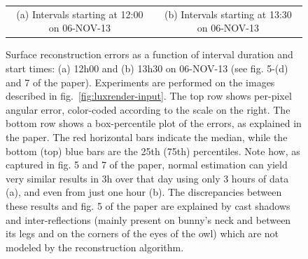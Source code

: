 \begin{figure}
\begin{tabular}{cc}
(a) Intervals starting at 12:00 on 06-NOV-13 & (b) Intervals starting at 13:30 on 06-NOV-13
\end{tabular}
\vspace{.5em}
\caption{\small Surface reconstruction errors as a function of interval duration and start times: (a) 12h00 and (b) 13h30 on 06-NOV-13 (see fig. 5-(d) and 7 of the paper). Experiments are performed on the images described in fig.~\ref{fig:luxrender-input}. The top row shows per-pixel angular error, color-coded according to the scale on the right. The bottom row shows a box-percentile plot of the errors, as explained in the paper. The red horizontal bars indicate the median, while the bottom (top) blue bars are the 25th (75th) percentiles. Note how, as captured in fig. 5 and 7 of the paper, normal estimation can yield very similar results in 3h over that day using only 3 hours of data (a), and even from just one hour (b). The discrepancies between these results and fig. 5 of the paper are explained by cast shadows and inter-reflections (mainly present on bunny's neck and between its legs and on the corners of the eyes of the owl) which are not modeled by the reconstruction algorithm.}
\label{fig:luxrender-results}
\end{figure}



% 


% 
% 

